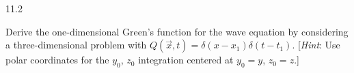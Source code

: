 \begin{exercises}{11.2}
\item \label{ex:11.2.15}
Derive the one-dimensional Green's function for the wave equation by considering a three-dimensional problem with $Q(\vec{x},t) = \delta(x - x_1)\delta(t - t_1)$.  [\emph{Hint}: Use polar coordinates for the $y_0$, $z_0$ integration centered at $y_0 = y$, $z_0 = z$.]

\end{exercises}


